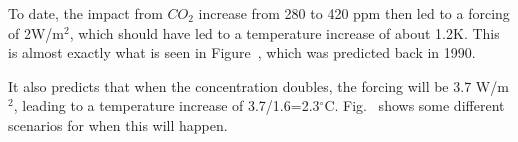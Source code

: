 To date, the impact from $CO_2$ increase from 280 to 420 ppm then led to a forcing of 2W/m$^2$, which should have led to a temperature increase of about 1.2K. This is almost exactly what is seen in Figure~, which was predicted back in 1990.

It also predicts that when the concentration doubles, the forcing will be 3.7 W/m$^2$, leading to a temperature increase of 3.7/1.6=2.3$^\circ$C. Fig.~ shows some different scenarios for when this will happen.


